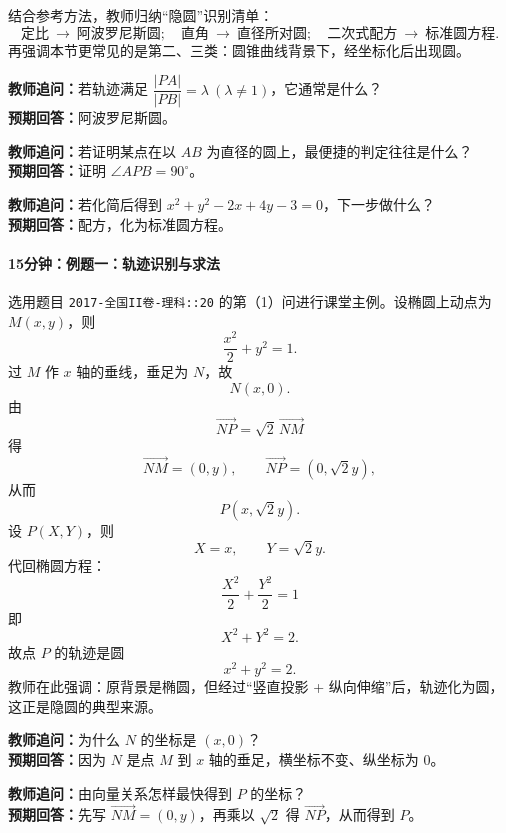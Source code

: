 \documentclass[UTF8,a4paper,11pt]{ctexart}
\begin{document}
结合参考方法，教师归纳“隐圆”识别清单：
\[
\text{定比}\ \to\ \text{阿波罗尼斯圆};\quad
\text{直角}\ \to\ \text{直径所对圆};\quad
\text{二次式配方}\ \to\ \text{标准圆方程}.
\]
再强调本节更常见的是第二、三类：圆锥曲线背景下，经坐标化后出现圆。

\noindent\textbf{教师追问：}若轨迹满足 $\dfrac{|PA|}{|PB|}=\lambda\ (\lambda\ne 1)$，它通常是什么？\\

\textbf{预期回答：}阿波罗尼斯圆。\par

\noindent\textbf{教师追问：}若证明某点在以 $AB$ 为直径的圆上，最便捷的判定往往是什么？\\

\textbf{预期回答：}证明 $\angle APB=90^\circ$。\par

\noindent\textbf{教师追问：}若化简后得到 $x^2+y^2-2x+4y-3=0$，下一步做什么？\\

\textbf{预期回答：}配方，化为标准圆方程。\par

\paragraph{15分钟：例题一：轨迹识别与求法}

选用题目 \texttt{2017-全国II卷-理科::20} 的第（1）问进行课堂主例。设椭圆上动点为 $M(x,y)$，则
\[
\frac{x^2}{2}+y^2=1.
\]
过 $M$ 作 $x$ 轴的垂线，垂足为 $N$，故
\[
N(x,0).
\]
由
\[
\overrightarrow{NP}=\sqrt{2}\,\overrightarrow{NM}
\]
得
\[
\overrightarrow{NM}=(0,y),\qquad \overrightarrow{NP}=(0,\sqrt{2}y),
\]
从而
\[
P(x,\sqrt{2}y).
\]
设 $P(X,Y)$，则
\[
X=x,\qquad Y=\sqrt{2}y.
\]
代回椭圆方程：
\[
\frac{X^2}{2}+\frac{Y^2}{2}=1
\]
即
\[
X^2+Y^2=2.
\]
故点 $P$ 的轨迹是圆
\[
x^2+y^2=2.
\]
教师在此强调：原背景是椭圆，但经过“竖直投影 + 纵向伸缩”后，轨迹化为圆，这正是隐圆的典型来源。

\noindent\textbf{教师追问：}为什么 $N$ 的坐标是 $(x,0)$？\\

\textbf{预期回答：}因为 $N$ 是点 $M$ 到 $x$ 轴的垂足，横坐标不变、纵坐标为 $0$。\par

\noindent\textbf{教师追问：}由向量关系怎样最快得到 $P$ 的坐标？\\

\textbf{预期回答：}先写 $\overrightarrow{NM}=(0,y)$，再乘以 $\sqrt{2}$ 得 $\overrightarrow{NP}$，从而得到 $P$。\par
\end{document}
